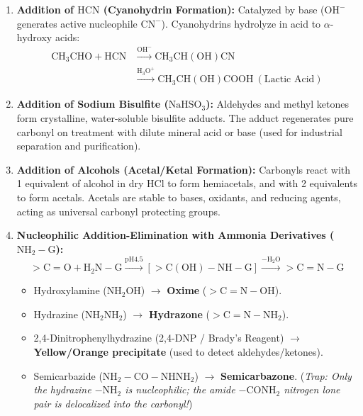 \documentclass[10pt,twoside,openright]{book}
\begin{document}
\begin{usecasebox}
\begin{enumerate}[leftmargin=*]
  \item \textbf{Addition of $\mathrm{HCN}$ (Cyanohydrin Formation):} Catalyzed by base ($\mathrm{OH^-}$ generates active nucleophile $\mathrm{CN^-}$). Cyanohydrins hydrolyze in acid to $\alpha$-hydroxy acids:
  \begin{align}
    \mathrm{CH_3CHO} + \mathrm{HCN} &\xrightarrow{\mathrm{OH^-}} \mathrm{CH_3CH(OH)CN} \\
    &\xrightarrow{\mathrm{H_3O^+}} \mathrm{CH_3CH(OH)COOH} \ (\text{Lactic Acid})
  \end{align}
  \item \textbf{Addition of Sodium Bisulfite ($\mathrm{NaHSO_3}$):} Aldehydes and methyl ketones form crystalline, water-soluble bisulfite adducts. The adduct regenerates pure carbonyl on treatment with dilute mineral acid or base (used for industrial separation and purification).
  \item \textbf{Addition of Alcohols (Acetal/Ketal Formation):} Carbonyls react with 1 equivalent of alcohol in dry $\mathrm{HCl}$ to form hemiacetals, and with 2 equivalents to form acetals. Acetals are stable to bases, oxidants, and reducing agents, acting as universal carbonyl protecting groups.
  \item \textbf{Nucleophilic Addition-Elimination with Ammonia Derivatives ($\mathrm{NH_2-G}$):}
  \begin{equation}
    >\mathrm{C=O} + \mathrm{H_2N-G} \xrightarrow{\mathrm{pH } 4.5} [>\mathrm{C(OH)-NH-G}] \xrightarrow{-\mathrm{H_2O}} >\mathbf{\mathrm{C=N-G}}
  \end{equation}
  \begin{itemize}
    \item Hydroxylamine ($\mathrm{NH_2OH}$) $\to$ \textbf{Oxime} ($>\mathrm{C=N-OH}$).
    \item Hydrazine ($\mathrm{NH_2NH_2}$) $\to$ \textbf{Hydrazone} ($>\mathrm{C=N-NH_2}$).
    \item 2,4-Dinitrophenylhydrazine (2,4-DNP / Brady's Reagent) $\to$ \textbf{Yellow/Orange precipitate} (used to detect aldehydes/ketones).
    \item Semicarbazide ($\mathrm{NH_2-CO-NHNH_2}$) $\to$ \textbf{Semicarbazone}. (\textit{Trap: Only the hydrazine $-\mathrm{NH_2}$ is nucleophilic; the amide $-\mathrm{CONH_2}$ nitrogen lone pair is delocalized into the carbonyl!})
  \end{itemize}
\end{enumerate}
\end{usecasebox}
\end{document}
